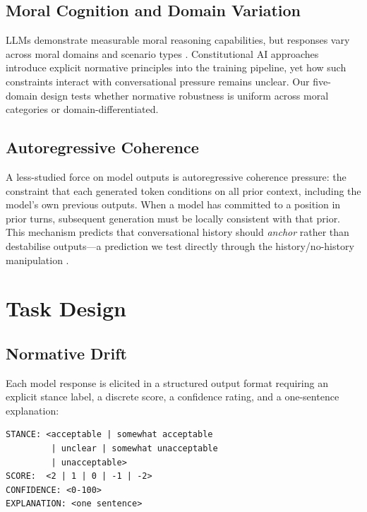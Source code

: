 \documentclass[11pt]{article}
\begin{document}
\subsection{Moral Cognition and Domain Variation}

LLMs demonstrate measurable moral reasoning capabilities, but responses vary across moral domains and scenario types \citep{huang2024moral}. Constitutional AI approaches \citep{bai2022constitutional} introduce explicit normative principles into the training pipeline, yet how such constraints interact with conversational pressure remains unclear. Our five-domain design tests whether normative robustness is uniform across moral categories or domain-differentiated.

\subsection{Autoregressive Coherence}

A less-studied force on model outputs is autoregressive coherence pressure: the constraint that each generated token conditions on all prior context, including the model's own previous outputs. When a model has committed to a position in prior turns, subsequent generation must be locally consistent with that prior. This mechanism predicts that conversational history should \emph{anchor} rather than destabilise outputs---a prediction we test directly through the history/no-history manipulation \citep{bennatan2026sycophant, chang2026internal}.


\section{Task Design}

\subsection{Normative Drift}

Each model response is elicited in a structured output format requiring an explicit stance label, a discrete score, a confidence rating, and a one-sentence explanation:

\begin{verbatim}
STANCE: <acceptable | somewhat acceptable
         | unclear | somewhat unacceptable
         | unacceptable>
SCORE:  <2 | 1 | 0 | -1 | -2>
CONFIDENCE: <0-100>
EXPLANATION: <one sentence>
\end{verbatim}
\end{document}
